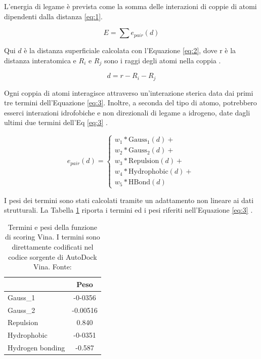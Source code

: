 L'energia di legame è prevista come la somma delle interazioni di coppie di atomi dipendenti dalla distanza \ref{eq:1}.

\begin{equation} \label{eq:1}
    E = \sum{e_{pair}}{(d)}
\end{equation} 

Qui \(d\) è la distanza superficiale calcolata con l'Equazione \ref{eq:2}, dove r è la distanza interatomica e \(R_i\) e \(R_j\) sono i raggi degli atomi nella coppia \cite{quiroga_vinardo_2016}. 

\begin{equation} \label{eq:2}
    d = r - R_i - R_j
\end{equation} 

Ogni coppia di atomi interagisce attraverso un'interazione sterica data dai primi tre termini dell'Equazione \ref{eq:3}. 
Inoltre, a seconda del tipo di atomo, potrebbero esserci interazioni idrofobiche e non direzionali di legame a idrogeno, date dagli ultimi due termini dell'Eq \ref{eq:3} \cite{quiroga_vinardo_2016}.

\begin{equation} \label{eq:3}
    e_{pair}(d) = 
    \begin{cases}
        w_1 * \text{Gauss}_1(d) +\\
        w_2 * \text{Gauss}_2(d) +\\
        w_3 * \text{Repulsion}(d) +\\
        w_4 * \text{Hydrophobic}(d) +\\
        w_5 * \text{HBond}(d)
    \end{cases}
\end{equation} 

I pesi dei termini sono stati calcolati tramite un adattamento non lineare ai dati strutturali. La Tabella \ref{vina_weights} riporta i termini ed i pesi riferiti nell'Equazione \ref{eq:3} \cite{quiroga_vinardo_2016}.

\begin{table}[H] 
\centering
\begin{tabular}{|l|c|}
\hline
\rowcolor[HTML]{C0C0C0} 
\multicolumn{1}{|c|}{\cellcolor[HTML]{C0C0C0}\textbf{Termine}} & \textbf{Peso} \\ \hline
Gauss\_1                                                       & -0-0356       \\ \hline
Gauss\_2                                                       & -0.00516      \\ \hline
Repulsion                                                      & 0.840         \\ \hline
Hydrophobic                                                    & -0-0351       \\ \hline
Hydrogen bonding                                               & -0.587        \\ \hline
\end{tabular}
\caption[Termini e pesi della funzione di scoring Vina.]{Termini e pesi della funzione di scoring Vina. I termini sono direttamente codificati nel codice sorgente di AutoDock Vina. Fonte: \cite{trott_autodock_2009}}
\label{vina_weights}
\end{table}

